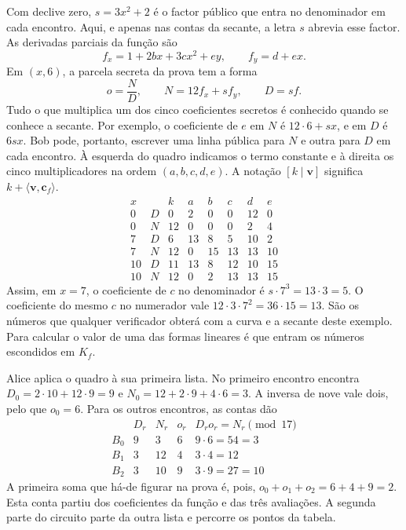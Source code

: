 Com declive zero, \(s=3x^2+2\) é o factor público que entra
no denominador em cada encontro. Aqui, e apenas nas contas
da secante, a letra \(s\) abrevia esse factor. As derivadas
parciais da função são
\[
 f_x=1+2bx+3cx^2+ey,\qquad f_y=d+ex .
\]
Em \((x,6)\), a parcela secreta da prova tem a forma
\[
          o=\frac{N}{D},\qquad N=12 f_x+s f_y,\qquad D=s f .
\]
Tudo o que multiplica um dos cinco coeficientes secretos é conhecido
quando se conhece a secante. Por exemplo, o coeficiente de \(e\)
em \(N\) é \(12\cdot6+sx\), e em \(D\) é \(6sx\).
Bob pode, portanto, escrever uma linha pública para \(N\) e outra
para \(D\) em cada encontro. À esquerda do quadro indicamos o
termo constante e à direita os cinco multiplicadores na ordem
\((a,b,c,d,e)\). A notação \([k\mid\boldsymbol v]\) significa
\(k+\langle\boldsymbol v,\boldsymbol c_f\rangle\).
\[
\begin{array}{c|c|r|rrrrr}
 x& &k&a&b&c&d&e\\ \hline
 0&D&0 &2&0&0&12&0\\
 0&N&12&0&0&0& 2&4\\
 7&D&6 &13&8&5&10&2\\
 7&N&12&0&15&13&13&10\\
10&D&11&13&8&12&10&15\\
10&N&12&0&2&13&13&15
\end{array}
\]
Assim, em \(x=7\), o coeficiente de \(c\) no denominador é
\(s\cdot 7^3=13\cdot3=5\). O coeficiente do mesmo \(c\)
no numerador vale \(12\cdot3\cdot7^2=36\cdot15=13\).
São os números que qualquer verificador obterá com a curva e a
secante deste exemplo. Para calcular o valor de uma das formas
lineares é que entram os números escondidos em \(K_f\).

Alice aplica o quadro à sua primeira lista. No primeiro encontro
encontra \(D_0=2\cdot10+12\cdot9=9\) e
\(N_0=12+2\cdot9+4\cdot6=3\). A inversa de nove vale dois,
pelo que \(o_0=6\). Para os outros encontros, as contas dão
\[
\begin{array}{c|rrr|l}
       &D_r&N_r&o_r&D_ro_r=N_r\pmod{17}\\ \hline
 B_0&9&3 &6&9\cdot6=54=3\\
 B_1&3&12&4&3\cdot4=12\\
 B_2&3&10&9&3\cdot9=27=10
\end{array}
\]
A primeira soma que há-de figurar na prova é, pois,
\(o_0+o_1+o_2=6+4+9=2\). Esta conta partiu dos coeficientes da
função e das três avaliações. A segunda parte do circuito parte
da outra lista e percorre os pontos da tabela.

